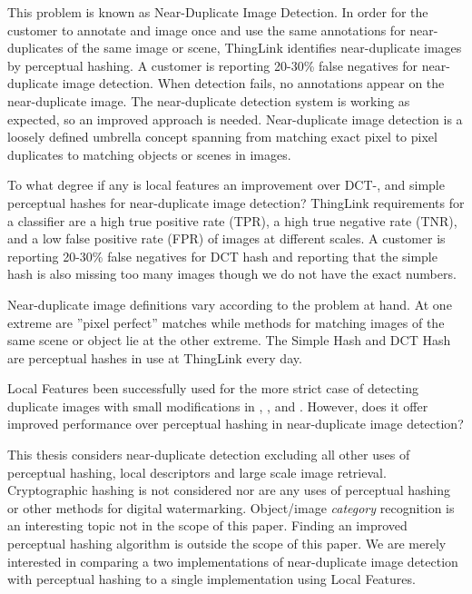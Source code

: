 \documentclass[english,12pt,a4paper,pdftex,elec,utf8, table]{aaltothesis}
\begin{document}
This problem is known as Near-Duplicate Image Detection. In order for the customer to annotate and image once and use the same annotations for near-duplicates of the same image or scene, ThingLink identifies near-duplicate images by perceptual hashing. A customer is reporting 20-30\% false negatives for near-duplicate image detection. When detection fails, no annotations appear on the near-duplicate image. The near-duplicate detection system is working as expected, so an improved approach is needed. Near-duplicate image detection is a loosely defined umbrella concept spanning from matching exact pixel to pixel duplicates to matching objects or scenes in images.

To what degree if any is local features an improvement over DCT-, and simple perceptual hashes for near-duplicate image detection? ThingLink requirements for a classifier are a high true positive rate (TPR), a high true negative rate (TNR), and a low false positive rate (FPR) of images at different scales. A customer is reporting 20-30\% false negatives for DCT hash and reporting that the simple hash is also missing too many images though we do not have the exact numbers.

Near-duplicate image definitions vary according to the problem at hand. At one extreme are ''pixel perfect'' matches while methods for matching images of the same scene or object lie at the other extreme. The Simple Hash and DCT Hash are perceptual hashes in use at ThingLink every day.

Local Features been successfully used for the more strict case of detecting duplicate images with small modifications in \cite{Chum2008}, \cite{Chum2010}, \cite{Lee2010} and \cite{dong2012high}. However, does it offer improved performance over perceptual hashing in near-duplicate image detection?

This thesis considers near-duplicate detection excluding all other uses of perceptual hashing, local descriptors and large scale image retrieval. Cryptographic hashing is not considered nor are any uses of perceptual hashing or other methods for digital watermarking. Object/image \emph{category} recognition is an interesting topic not in the scope of this paper. Finding an improved perceptual hashing algorithm is outside the scope of this paper. We are merely interested in comparing a two implementations of near-duplicate image detection with perceptual hashing to a single implementation using Local Features.
\end{document}
